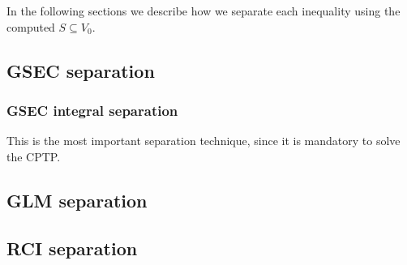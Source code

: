 In the following sections we describe how we separate each inequality using the computed $S \subseteq V_0$.

\subsection{GSEC separation}

\subsubsection{GSEC integral separation}
This is the most important separation technique, since it is mandatory to solve the CPTP.


\subsection{GLM separation}

\subsection{RCI separation}
